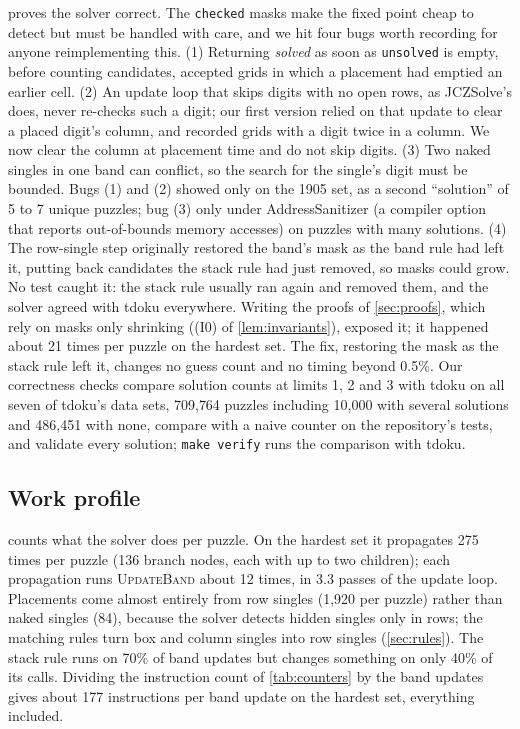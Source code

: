 \documentclass[11pt]{article}
\theoremstyle{definition}
\theoremstyle{plain}
\let\origtextsc\textsc
\renewcommand{\textsc}[1]{\textup{\origtextsc{#1}}}
\begin{document}
 proves the solver correct. The \texttt{checked} masks make the fixed point cheap to detect but must be handled with care, and we hit four bugs
worth recording for anyone reimplementing this. (1) Returning \emph{solved} as soon as \texttt{unsolved} is empty,
before counting candidates, accepted grids in which a placement had emptied an earlier cell. (2) An update loop that
skips digits with no open rows, as JCZSolve's does, never re-checks such a digit; our first version relied on that
update to clear a placed digit's column, and recorded grids with a digit twice in a column. We now clear the column
at placement time and do not skip digits. (3) Two naked singles in one band can conflict, so the search for the
single's digit must be bounded. Bugs (1) and (2) showed only on the 1905 set, as a second ``solution'' of 5 to 7
unique puzzles; bug (3) only under AddressSanitizer (a compiler option that reports
out-of-bounds memory accesses) on puzzles with many solutions. (4) The row-single step originally restored the band's mask as the band rule had left it, putting back candidates
the stack rule had just removed, so masks could grow. No test caught it: the stack rule usually ran again and
removed them, and the solver agreed with tdoku everywhere. Writing the proofs of \cref{sec:proofs}, which rely on masks
only shrinking ((I0) of \cref{lem:invariants}), exposed it; it happened about 21 times per puzzle on the hardest set. The fix, restoring the mask as
the stack rule left it, changes no guess count and no timing beyond 0.5\%. Our correctness checks compare solution
counts at limits 1, 2 and 3 with tdoku on all seven of tdoku's data sets, 709{,}764 puzzles including 10{,}000 with
several solutions and 486{,}451 with none, compare with a naive counter on the repository's tests, and validate every
solution; \texttt{make verify} runs the comparison with tdoku.

\subsection{Work profile}

 counts what the solver does per puzzle. On the hardest set it propagates 275 times per puzzle (136
branch nodes, each with up to two children); each propagation runs \textsc{UpdateBand} about 12 times, in 3.3 passes of the update
loop. Placements come almost entirely from row singles (1{,}920 per puzzle) rather than naked
singles (84), because the solver detects hidden singles only in rows; the matching rules turn box and column
singles into row singles (\cref{sec:rules}). The stack rule runs on 70\% of band
updates but changes something on only 40\% of its calls. Dividing the instruction count of \cref{tab:counters} by the
band updates gives about 177 instructions per band update on the hardest set, everything included.
\end{document}

